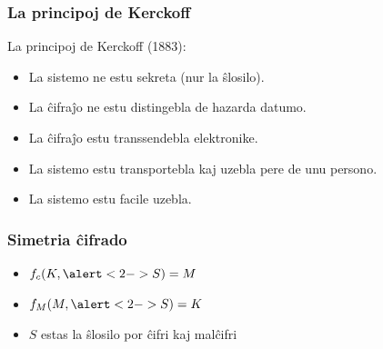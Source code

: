 \documentclass[utf8, aspectratio=169]{beamer}
\begin{document}
\begin{frame}
  \frametitle{La principoj de Kerckoff}
  La principoj de Kerckoff (1883):
  \begin{itemize}
  \item<alert@2> La sistemo ne estu sekreta (nur la ŝlosilo).
  \item La ĉifraĵo ne estu distingebla de hazarda datumo.
  \item La ĉifraĵo estu transsendebla elektronike.
  \item La sistemo estu transportebla kaj uzebla pere de unu persono.
  \item La sistemo estu facile uzebla.
  \end{itemize}
\end{frame}

\begin{frame}
  \frametitle{Simetria ĉifrado}
  \begin{figure}
  \end{figure}

  \begin{itemize}
  \item $f_c(K, \alert<2->{S}) = M$
  \item $f_M(M, \alert<2->{S}) = K$
  \item<2-> \alert{$S$} estas la ŝlosilo por ĉifri kaj malĉifri
  \end{itemize}

\end{frame}
\end{document}
